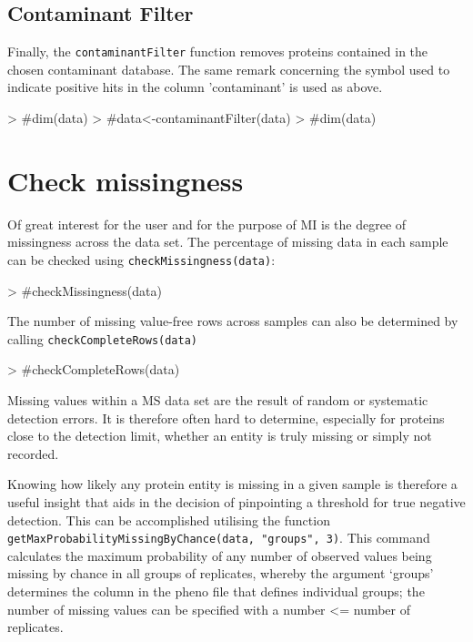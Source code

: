 \documentclass[a4paper,11pt]{article}
\newcommand{\Rfunction}[1]{{\texttt{#1}}}
\begin{document}
\subsection{Contaminant Filter}

Finally, the \Rfunction{contaminantFilter} function removes proteins contained in the chosen contaminant database. The same remark concerning the symbol used to indicate positive hits in the column 'contaminant' is used as above.

\begin{Schunk}
\begin{Sinput}
> #dim(data)
> #data<-contaminantFilter(data)
> #dim(data)
\end{Sinput}
\end{Schunk}

\section{Check missingness}

Of great interest for the user and for the purpose of MI is the degree of missingness across the data set. The percentage of missing data in each sample can be checked using \Rfunction{checkMissingness(data)}:

\begin{Schunk}
\begin{Sinput}
> #checkMissingness(data)
\end{Sinput}
\end{Schunk}

The number of missing value-free rows across samples can also be determined by calling \Rfunction{checkCompleteRows(data)}

\begin{Schunk}
\begin{Sinput}
> #checkCompleteRows(data)
\end{Sinput}
\end{Schunk}


Missing values within a MS data set are the result of random or systematic detection errors. It is therefore often hard to determine, especially for proteins close to the detection limit, whether an entity is truly missing or simply not recorded. 

Knowing how likely any protein entity is missing in a given sample is therefore a useful insight that aids in the decision of pinpointing a threshold for true negative detection. This can be accomplished utilising the function \Rfunction{getMaxProbabilityMissingByChance(data, "groups", 3)}. This command calculates the maximum probability of any number of observed values being missing by chance in all groups of replicates, whereby the argument ‘groups’ determines the column in the pheno file that defines individual groups; the number of missing values can be specified with a number <= number of replicates.
\end{document}
